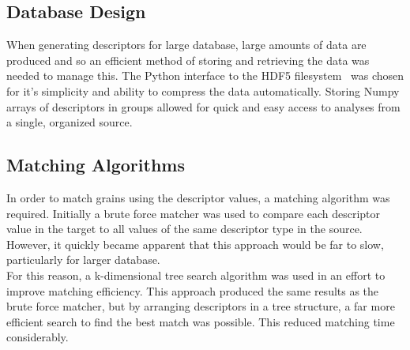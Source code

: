 \documentclass[titlepage]{scrartcl}
\begin{document}
    \subsection*{Database Design}
    When generating descriptors for large database, large amounts of data are
    produced and so an efficient method of storing and retrieving the data was
    needed to manage this. The Python interface to the HDF5
    filesystem~\parencite{Collette2016} was chosen for it's simplicity and
    ability to compress the data automatically. Storing Numpy arrays of
    descriptors in groups allowed for quick and easy access to analyses from a
    single, organized source.

    \subsection*{Matching Algorithms}
    In order to match grains using the descriptor values, a matching algorithm
    was required. Initially a brute force matcher was used to compare each
    descriptor value in the target to all values of the same descriptor type in
    the source. However, it quickly became apparent that this approach would be
    far to slow, particularly for larger database.\\
    For this reason, a k-dimensional tree search algorithm was used in an
    effort to improve matching efficiency.  This approach produced the same
    results as the brute force matcher, but by arranging descriptors in a tree
    structure, a far more efficient search to find the best match was possible.
    This reduced matching time considerably.
\end{document}
